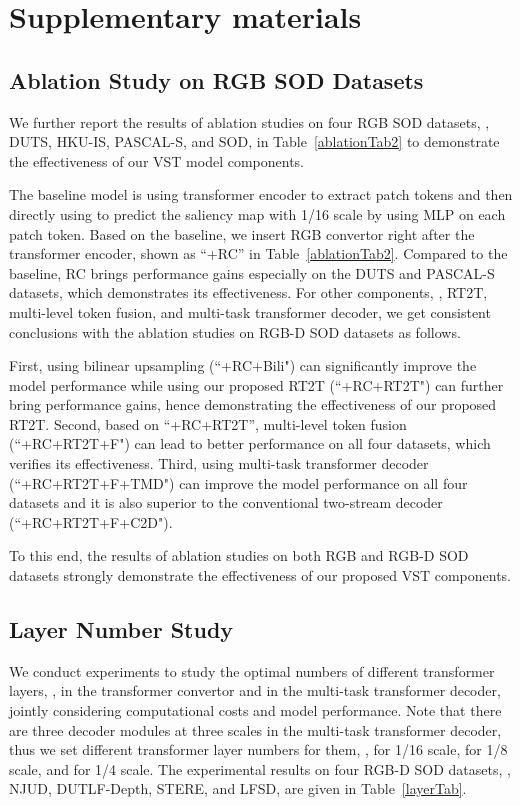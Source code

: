 \documentclass[10pt,twocolumn,letterpaper]{article}
\begin{document}
\section{Supplementary materials}
\subsection{Ablation Study on RGB SOD Datasets}

We further report the results of ablation studies on four RGB SOD datasets, \ie, DUTS, HKU-IS, PASCAL-S, and SOD, in Table~\ref{ablationTab2} to demonstrate the effectiveness of our VST model components.

The baseline model is using transformer encoder to extract patch tokens  and then directly using  to predict the saliency map with 1/16 scale by using MLP on each patch token.
Based on the baseline, we insert RGB convertor right after the transformer encoder, shown as ``+RC'' in Table~\ref{ablationTab2}.
Compared to the baseline, RC brings performance gains especially on the DUTS and PASCAL-S datasets, which demonstrates its effectiveness.
For other components, \ie, RT2T, multi-level token fusion, and multi-task transformer decoder, we get consistent conclusions with the ablation studies on RGB-D SOD datasets as follows.

First, using bilinear upsampling (``+RC+Bili") can significantly improve the model performance while using our proposed RT2T (``+RC+RT2T") can further bring performance gains, hence demonstrating the effectiveness of our proposed RT2T.
Second, based on ``+RC+RT2T'', multi-level token fusion (``+RC+RT2T+F") can lead to better performance on all four datasets, which verifies its effectiveness.
Third, using multi-task transformer decoder (``+RC+RT2T+F+TMD") can improve the model performance on all four datasets and it is also superior to the conventional two-stream decoder (``+RC+RT2T+F+C2D").

To this end, the results of ablation studies on both RGB and RGB-D SOD datasets strongly demonstrate the effectiveness of our proposed VST components.


\subsection{Layer Number Study}
We conduct experiments to study the optimal numbers of different transformer layers, \ie,  in the transformer convertor and  in the multi-task transformer decoder, jointly considering computational costs and model performance. Note that there are three decoder modules at three scales in the multi-task transformer decoder, thus we set different transformer layer numbers for them, \ie,  for 1/16 scale,  for 1/8 scale, and  for 1/4 scale.
The experimental results on four RGB-D SOD datasets, \ie, NJUD, DUTLF-Depth, STERE, and LFSD, are given in Table~\ref{layerTab}.
\end{document}
